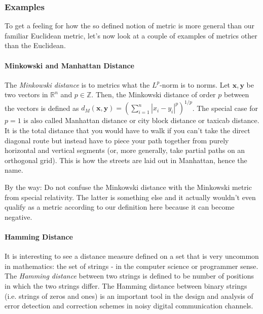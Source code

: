 \medskip
[Q: Can we turn this around by saying that a metric induces a norm by defining the norm as distance from the origin $|\mathbf{x}| = d (\mathbf{x, 0})$ whenever our set happens to have some special element $\mathbf{0}$ that we call the origin?]

\subsubsection{Examples} To get a feeling for how the so defined notion of metric is more general than our familiar Euclidean metric, let's now look at a couple of examples of metrics other than the Euclidean. 

\paragraph{Minkowski and Manhattan Distance}
The \emph{Minkowski distance} is to metrics what the $L^p$-norm is to norms. Let $\mathbf{x,y}$ be two vectors in $\mathbb{R}^n$ and $p \in \mathbb{Z}$. Then, the Minkowski distance of order $p$ between the vectors is defined as $d_M(\mathbf{x,y}) = (\sum_{i=1}^n |x_i - y_i|^p )^{1/p}$. The special case for $p=1$ is also called Manhattan distance or city block distance or taxicab distance. It is the total distance that you would have to walk if you can't take the direct diagonal route but instead have to piece your path together from purely horizontal and vertical segments (or, more generally, take partial paths on an orthogonal grid). This is how the streets are laid out in Manhattan, hence the name. 


\medskip
By the way: Do not confuse the Minkowski distance with the Minkowski metric from special relativity. The latter is something else and it actually wouldn't even qualify as a metric according to our definition here because it can become negative.



\paragraph{Hamming Distance} 
It is interesting to see a distance measure defined on a set that is very uncommon in mathematics: the set of strings - in the computer science or programmer sense. The \emph{Hamming distance} between two strings is defined to be number of positions in which the two strings differ. The Hamming distance between binary strings (i.e. strings of zeros and ones) is an important tool in the design and analysis of error detection and correction schemes in noisy digital communication channels. 


